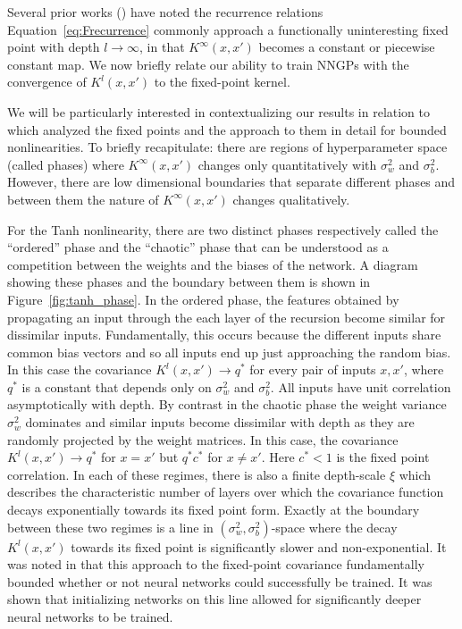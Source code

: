 \documentclass{article} %
\begin{document}
Several prior works (\cite{poole2016exponential, schoenholz2016, daniely2016,duvenaud2014}) have noted the recurrence relations Equation~\ref{eq:Frecurrence} commonly approach a functionally uninteresting fixed point with depth $l \rightarrow \infty$, in that $K^{\infty}(x,x')$ becomes a constant or piecewise constant map. We now briefly relate our ability to train NNGPs with the convergence of $K^l(x,x')$ to the fixed-point kernel. 

We will be particularly interested in contextualizing our results in relation to \citet{poole2016exponential,schoenholz2016} which analyzed the fixed points and the approach to them in detail for bounded nonlinearities. To briefly recapitulate: there are regions of hyperparameter space (called phases) where $K^\infty(x,x')$ changes only quantitatively with $\sigma_w^2$ and $\sigma_b^2$. However, there are low dimensional boundaries that separate different phases and between them the nature of $K^\infty(x,x')$ changes qualitatively. 

For the Tanh nonlinearity, there are two distinct phases respectively called the ``ordered'' phase and the ``chaotic'' phase that can be understood as a competition between the weights and the biases of the network. A diagram showing these phases and the boundary between them is shown in Figure~\ref{fig:tanh_phase}. In the ordered phase, the features obtained by propagating an input through the each layer of the recursion become similar for dissimilar inputs. Fundamentally, this occurs because the different inputs share common bias vectors and so all inputs end up just approaching the random bias. In this case the covariance $K^{l}(x,x') \rightarrow q^*$ for every pair of inputs $x,x'$, where $q^*$ is a constant that depends only on $\sigma_w^2$ and $\sigma_b^2$. All inputs have unit correlation asymptotically with depth. By contrast in the chaotic phase the weight variance $\sigma^2_w$ dominates and similar inputs become dissimilar with depth as they are randomly projected by the weight matrices. In this case, the covariance $K^{l}(x,x') \rightarrow q^*$ for $x = x'$ but $q^* c^*$ for $x \neq x'$. Here $c^* < 1$ is the fixed point correlation. In each of these regimes, there is also a finite depth-scale $\xi$  which describes the characteristic number of layers over which the covariance function decays exponentially towards its fixed point form. Exactly at the boundary between these two regimes is a line in $(\sigma_w^2, \sigma_b^2)$-space where the decay $K^l(x,x')$ towards its fixed point is significantly slower and non-exponential. It was noted in \citet{schoenholz2016} that this approach to the fixed-point covariance fundamentally bounded whether or not neural networks could successfully be trained. It was shown that initializing networks on this line allowed for significantly deeper neural networks to be trained.
\end{document}
